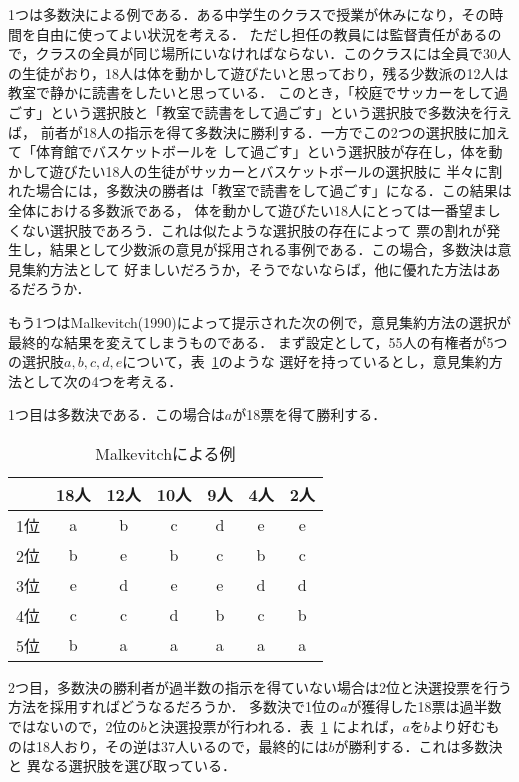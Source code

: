 \documentclass[dvipdfmx]{jsarticle}
\begin{document}
1つは多数決による例である．ある中学生のクラスで授業が休みになり，その時間を自由に使ってよい状況を考える．
ただし担任の教員には監督責任があるので，クラスの全員が同じ場所にいなければならない．このクラスには全員で30人
の生徒がおり，18人は体を動かして遊びたいと思っており，残る少数派の12人は教室で静かに読書をしたいと思っている．
このとき，「校庭でサッカーをして過ごす」という選択肢と「教室で読書をして過ごす」という選択肢で多数決を行えば，
前者が18人の指示を得て多数決に勝利する．一方でこの2つの選択肢に加えて「体育館でバスケットボールを
して過ごす」という選択肢が存在し，体を動かして遊びたい18人の生徒がサッカーとバスケットボールの選択肢に
半々に割れた場合には，多数決の勝者は「教室で読書をして過ごす」になる．この結果は全体における多数派である，
体を動かして遊びたい18人にとっては一番望ましくない選択肢であろう．これは似たような選択肢の存在によって
票の割れが発生し，結果として少数派の意見が採用される事例である．この場合，多数決は意見集約方法として
好ましいだろうか，そうでないならば，他に優れた方法はあるだろうか．

もう1つはMalkevitch(1990)によって提示された次の例で，意見集約方法の選択が最終的な結果を変えてしまうものである．
まず設定として，55人の有権者が5つの選択肢$a,b,c,d,e$について，表~\ref{tab:Malkevitch}のような
選好を持っているとし，意見集約方法として次の4つを考える．

1つ目は多数決である．この場合は$a$が18票を得て勝利する．

\begin{table}[h]
  \caption{Malkevitchによる例}\label{tab:Malkevitch}
  \begin{center}
    \begin{tabular}{c|c|c|c|c|c|c}
      & 18人 & 12人 & 10人 & 9人 & 4人 & 2人 \\ \hline
    1位 & a & b & c & d & e & e \\
    2位 & b & e & b & c & b & c \\
    3位 & e & d & e & e & d & d \\
    4位 & c & c & d & b & c & b \\
    5位 & b & a & a & a & a & a \\
\end{tabular}
  \end{center}
\end{table}

2つ目，多数決の勝利者が過半数の指示を得ていない場合は2位と決選投票を行う方法を採用すればどうなるだろうか．
多数決で1位の$a$が獲得した18票は過半数ではないので，2位の$b$と決選投票が行われる．表~\ref{tab:Malkevitch}
によれば，$a$を$b$より好むものは18人おり，その逆は37人いるので，最終的には$b$が勝利する．これは多数決と
異なる選択肢を選び取っている．
\end{document}
